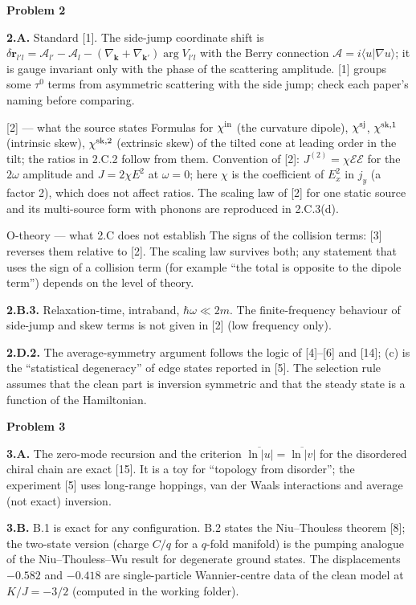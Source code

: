\documentclass[11pt,a4paper]{article}
\newcommand{\avg}[1]{\overline{#1}}
\newcommand{\smallheading}[1]{\par\Needspace{6\baselineskip}\medskip\textbf{#1}\par}
\begin{document}
\smallheading{Problem 2}
\textbf{2.A.} Standard [1]. The side-jump coordinate shift is $\delta\bm r_{l'l}=\mathcal A_{l'}-\mathcal A_l-(\nabla_{\bm k}+\nabla_{\bm k'})\arg V_{l'l}$ with the Berry connection $\mathcal A=i\langle u|\nabla u\rangle$; it is gauge invariant only with the phase of the scattering amplitude. [1] groups some $\tau^0$ terms from asymmetric scattering with the side jump; check each paper's naming before comparing.
\begin{greenbox}{[2] --- what the source states}
Formulas for $\chi^{\rm in}$ (the curvature dipole), $\chi^{\rm sj}$, $\chi^{\rm sk,1}$ (intrinsic skew), $\chi^{\rm sk,2}$ (extrinsic skew) of the tilted cone at leading order in the tilt; the ratios in 2.C.2 follow from them. Convention of [2]: $J^{(2)}=\chi\mathcal E\mathcal E$ for the $2\omega$ amplitude and $J=2\chi E^2$ at $\omega=0$; here $\chi$ is the coefficient of $E_x^2$ in $j_y$ (a factor 2), which does not affect ratios. The scaling law of [2] for one static source and its multi-source form with phonons are reproduced in 2.C.3(d).
\end{greenbox}
\begin{redbox}{O-theory --- what 2.C does not establish}
The signs of the collision terms: [3] reverses them relative to [2]. The scaling law survives both; any statement that uses the sign of a collision term (for example ``the total is opposite to the dipole term'') depends on the level of theory.
\end{redbox}
\textbf{2.B.3.} Relaxation-time, intraband, $\hbar\omega\ll2m$. The finite-frequency behaviour of side-jump and skew terms is not given in [2] (low frequency only).

\textbf{2.D.2.} The average-symmetry argument follows the logic of [4]--[6] and [14]; (c) is the ``statistical degeneracy'' of edge states reported in [5]. The selection rule assumes that the clean part is inversion symmetric and that the steady state is a function of the Hamiltonian.

\smallheading{Problem 3}
\textbf{3.A.} The zero-mode recursion and the criterion $\avg{\ln|u|}=\avg{\ln|v|}$ for the disordered chiral chain are exact [15]. It is a toy for ``topology from disorder''; the experiment [5] uses long-range hoppings, van der Waals interactions and average (not exact) inversion.

\textbf{3.B.} B.1 is exact for any configuration. B.2 states the Niu--Thouless theorem [8]; the two-state version (charge $C/q$ for a $q$-fold manifold) is the pumping analogue of the Niu--Thouless--Wu result for degenerate ground states. The displacements $-0.582$ and $-0.418$ are single-particle Wannier-centre data of the clean model at $K/J=-3/2$ (computed in the working folder).
\end{document}
